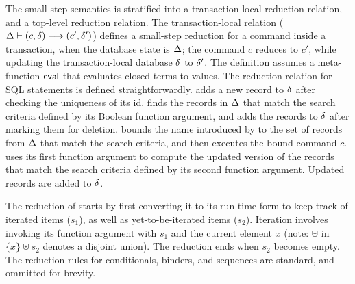 The small-step semantics is stratified into a transaction-local
reduction relation, and a top-level reduction relation. The
transaction-local relation ($\Delta \vdash (c,\delta) \longrightarrow
(c',\delta')$) defines a small-step reduction for a command inside a
transaction, when the database state is $\Delta$; the command $c$
reduces to $c'$, while updating the transaction-local database $\delta$
to $\delta'$. The definition assumes a meta-function $\textsf{eval}$ that
evaluates closed terms to values. The reduction relation for SQL
statements is defined straightforwardly.  adds a new record
to $\delta$ after checking the uniqueness of its id.  finds
the records in $\Delta$ that match the search criteria defined by its
Boolean function argument, and adds the records to $\delta$ after
marking them for deletion.  bounds the name introduced by
 to the set of records from $\Delta$ that match the search
criteria, and then executes the bound command $c$.  uses its
first function argument to compute the updated version of the records
that match the search criteria defined by its second function
argument. Updated records are added to $\delta$.

The reduction of  starts by first converting it to its
run-time form to keep track of iterated items ($s_1$), as well as
yet-to-be-iterated items ($s_2$).  Iteration involves invoking its
function argument with $s_1$ and the current element $x$ (note:
$\uplus$ in $\{x\} \uplus s_2$ denotes a disjoint union). The
reduction ends when $s_2$ becomes empty. The reduction rules for
conditionals,  binders, and sequences are standard, and
ommitted for brevity.

